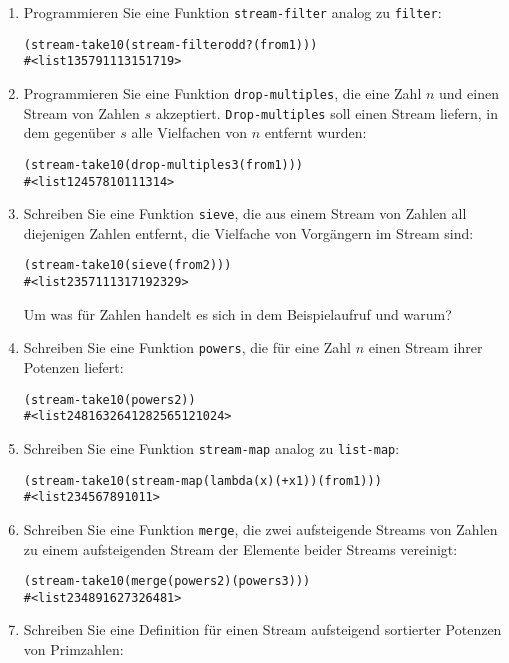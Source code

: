 \begin{aufgabe}
\begin{enumerate}
   \item Programmieren Sie eine Funktion \texttt{stream-filter} analog zu
     \texttt{filter}:
     \begin{alltt}
(stream-take 10 (stream-filter odd? (from 1)))
\evalsto{} #<list 1 3 5 7 9 11 13 15 17 19>
     \end{alltt}
   \item Programmieren Sie eine Funktion \texttt{drop-multiples}, die 
     eine Zahl $n$ und einen Stream von Zahlen $s$ akzeptiert.
     \texttt{Drop-multiples} soll einen Stream liefern, in dem
     gegenüber $s$  alle Vielfachen von $n$ entfernt wurden:
     \begin{alltt}
(stream-take 10 (drop-multiples 3 (from 1)))
\evalsto{} #<list 1 2 4 5 7 8 10 11 13 14>
     \end{alltt}
   \item Schreiben Sie eine Funktion \texttt{sieve}, die aus einem Stream
     von Zahlen all diejenigen Zahlen entfernt, die Vielfache von
     Vorgängern im Stream sind:
     \begin{alltt}
(stream-take 10 (sieve (from 2)))
\evalsto{} #<list 2 3 5 7 11 13 17 19 23 29>
     \end{alltt}
     Um was für Zahlen handelt es sich in dem Beispielaufruf und
     warum?
   \item Schreiben Sie eine Funktion \texttt{powers}, die für eine Zahl
     $n$ einen Stream ihrer Potenzen liefert:
     \begin{alltt}
(stream-take 10 (powers 2))
\evalsto{} #<list 2 4 8 16 32 64 128 256 512 1024>
     \end{alltt}
   \item Schreiben Sie eine Funktion \texttt{stream-map} analog zu
     \texttt{list-map}:
     \begin{alltt}
(stream-take 10 (stream-map (lambda (x) (+ x 1)) (from 1)))
\evalsto{} #<list 2 3 4 5 6 7 8 9 10 11>
     \end{alltt}
   \item Schreiben Sie eine Funktion \texttt{merge}, die zwei
     aufsteigende Streams von Zahlen zu einem aufsteigenden Stream
     der Elemente beider Streams vereinigt:
     \begin{alltt}
(stream-take 10 (merge (powers 2) (powers 3)))
\evalsto{} #<list 2 3 4 8 9 16 27 32 64 81>
     \end{alltt}
   \item Schreiben Sie eine Definition für einen Stream aufsteigend
     sortierter Potenzen von Primzahlen:

\end{enumerate}
\end{aufgabe}
